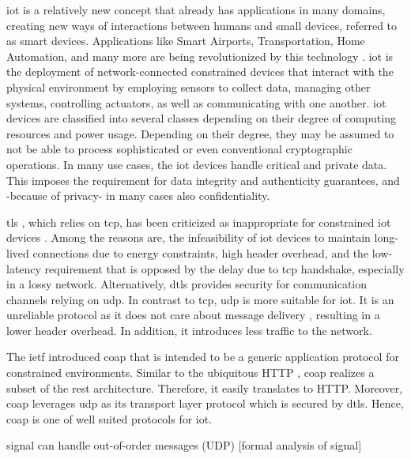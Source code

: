 \gls{iot} is a relatively new concept that already has applications in many domains, creating new ways of interactions between humans and small devices, referred to as smart devices. Applications like Smart Airports, Transportation, Home Automation, and many more are being revolutionized by this technology \cite{marksteiner2017overview}.
\gls{iot} is the deployment of network-connected constrained devices that interact with the physical environment by employing sensors to collect data, managing other systems, controlling actuators, as well as communicating with one another. \gls{iot} devices are classified into several classes depending on their degree of computing resources and power usage. Depending on their degree, they may be assumed to not be able to process sophisticated or even conventional cryptographic operations. In many use cases, the \gls{iot} devices handle critical and private data. This imposes the requirement for data integrity and authenticity guarantees, and -because of privacy- in many cases also confidentiality.
\par
\gls{tls} \cite{rfc5246}, which relies on \gls{tcp}, has been criticized as inappropriate for constrained \gls{iot} devices \cite{shang2016challenges}. Among the reasons are, the infeasibility of \gls{iot} devices to maintain long-lived connections due to energy constraints, high header overhead, and the low-latency requirement that is opposed by the delay due to \gls{tcp} handshake, especially in a lossy network.
Alternatively, \gls{dtls} \cite{dtls} provides security for communication channels relying on \gls{udp}. In contrast to \gls{tcp}, \gls{udp} is more suitable for \gls{iot}. It is an unreliable protocol as it does not care about message delivery , resulting in a lower header overhead. In addition, it introduces less traffic to the network.
\par
The \gls{ietf} introduced \gls{coap} \cite{rfc7252} that is intended to be a generic application protocol for constrained environments. Similar to the ubiquitous HTTP \cite{http}, \gls{coap} realizes a subset of the \gls{rest} architecture. Therefore, it easily translates to HTTP. Moreover, \gls{coap} leverages \gls{udp} as its transport layer protocol which is secured by \gls{dtls}. Hence, \gls{coap} is one of well suited protocols for \gls{iot}.

signal can handle out-of-order messages (UDP) [formal analysis of signal]
